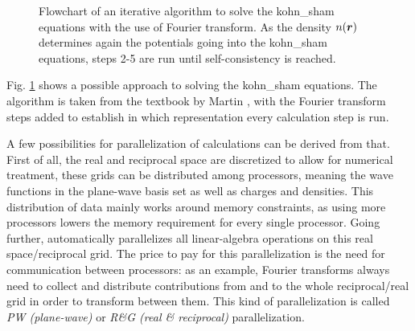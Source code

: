\documentclass[main.tex]{subfiles}
\begin{document}
\begin{figure}[htb!]
{}
\caption{Flowchart of an iterative algorithm to solve the \acrshort{kohn_sham} equations with the use of Fourier transform. As the density \(n(\vb*{r})\) determines again the potentials going into the \acrshort{kohn_sham} equations, steps 2-5 are run until self-consistency is reached.}
\label{fig:diagram-scf-calculations}
\end{figure}
Fig. \ref{fig:diagram-scf-calculations} shows a possible approach to solving the \acrshort{kohn_sham} equations.
The algorithm is taken from the textbook by Martin \cite{martin_electronic_2004}, with the Fourier transform steps added to establish in which representation every calculation step is run.

A few possibilities for parallelization of calculations can be derived from that.
First of all, the real and reciprocal space are discretized to allow for numerical treatment, these grids can be distributed among processors, meaning the wave functions in the plane-wave basis set as well as charges and densities.
This distribution of data mainly works around memory constraints, as using more processors lowers the memory requirement for every single processor.
Going further, \QE automatically parallelizes all linear-algebra operations on this real space/reciprocal grid.
The price to pay for this parallelization is the need for communication between processors: as an example, Fourier transforms always need to collect and distribute contributions from and to the whole reciprocal/real grid in order to transform between them.
This kind of parallelization is called \emph{PW (plane-wave)} or \emph{R\&G (real \& reciprocal)} parallelization. 
\end{document}
